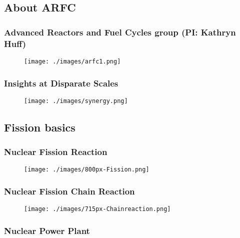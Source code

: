 \subsection{About ARFC}
\begin{frame}
  \frametitle{Advanced Reactors and Fuel Cycles group (PI: Kathryn Huff)}
               \begin{figure}[t]
                \vspace*{-0.1in}
                \texttt{[image: ./images/arfc1.png]}
               \end{figure}            
\end{frame}

\begin{frame}
  \frametitle{Insights at Disparate Scales}
               \begin{figure}[t]
                \vspace*{-0.1in}
			\hspace*{-0.35in}
                \texttt{[image: ./images/synergy.png]}
               \end{figure}            
\end{frame}

\subsection{Fission basics}
\begin{frame}
  \frametitle{Nuclear Fission Reaction}
               \begin{figure}[t]
                \vspace*{-0.1in}
			\hspace*{-0.35in}
                \texttt{[image: ./images/800px-Fission.png]}
               \end{figure}            
\end{frame}

\begin{frame}
  \frametitle{Nuclear Fission Chain Reaction}
               \begin{figure}[t]
                \vspace*{-0.1in}
			\hspace*{-0.35in}
                \texttt{[image: ./images/715px-Chainreaction.png]}
               \end{figure}            
\end{frame}

\begin{frame}
  \frametitle{Nuclear Power Plant}
\end{frame}

